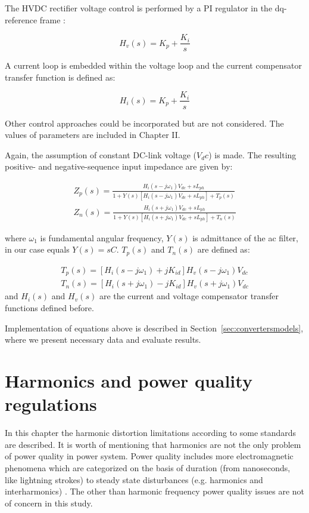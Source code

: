 \documentclass[12pt]{report} %
\begin{document}
The HVDC rectifier voltage control is performed by a PI regulator in the dq-reference frame \cite{liusun2014}:

\begin{equation}
	H_v (s)=K_p +\dfrac{K_i}{s}
\end{equation}

A current loop is embedded within the voltage loop and the current compensator transfer function is defined as:

\begin{equation}
	H_i (s)=K_p +\dfrac{K_i}{s}
\end{equation}

Other control approaches could be incorporated but are not considered. The values of parameters are included in Chapter II.

Again, the assumption of constant DC-link voltage ($V_dc$) is made. The resulting positive- and negative-sequence input impedance are given by:

\begin{equation} \label{eq:impedance_hvdc}
\begin{aligned}
	Z_p (s)=\frac{H_i (s-j\omega_1)V_{dc} +sL_{ph}}{1+Y(s)[H_i (s-j\omega_1 )V_{dc} +sL_{ph} ]+T_p (s)} \\
	Z_n (s)=\frac{H_i (s+j\omega_1)V_{dc} +sL_{ph}}{1+Y(s)[H_i (s+j\omega_1 )V_{dc} +sL_{ph} ]+T_n (s)}
\end{aligned}
\end{equation}

where $\omega_1$ is fundamental angular frequency, $Y(s)$ is admittance of the ac filter, in our case equals $Y(s)=sC$. $T_p (s)$ and $T_n (s)$ are defined as:

\begin{equation}
\begin{aligned}
	T_p (s)=[H_i (s-j\omega_1 )+jK_{id} ]H_v (s-j\omega_1 )V_{dc} \\
	T_n (s)=[H_i (s+j\omega_1 )-jK_{id} ]H_v (s+j\omega_1 )V_{dc}
\end{aligned}
\end{equation}
and $H_i (s)$ and $H_v (s)$ are the current and voltage compensator transfer functions defined before.

Implementation of equations above is described in Section~\ref{sec:convertersmodels}, where we present necessary data and evaluate results.

\chapter{Harmonics and power quality regulations} \label{sec:harmonicregulations}
In this chapter the harmonic distortion limitations according to some standards are described. It is worth of mentioning that harmonics are not the only problem of power quality in power system. Power quality includes more electromagnetic phenomena which are categorized on the basis of duration (from nanoseconds, like lightning strokes) to steady state disturbances (e.g. harmonics and interharmonics) \cite{das}. The other than harmonic frequency power quality issues are not of concern in this study. 
\end{document}
